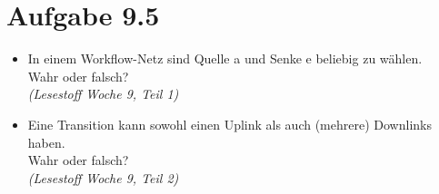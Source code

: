 \documentclass[12pt, paper=a4]{article}
\begin{document}
\section*{Aufgabe 9.5}
	\begin{itemize}
	\item In einem Workflow-Netz sind Quelle a und Senke e beliebig zu w\"ahlen.\\
		Wahr oder falsch?\\
		\textit{(Lesestoff Woche 9, Teil 1)}
	\item Eine Transition kann sowohl einen Uplink als auch (mehrere) Downlinks haben.\\
		Wahr oder falsch?\\
		\textit{(Lesestoff Woche 9, Teil 2)}
	\end{itemize}
\end{document}
